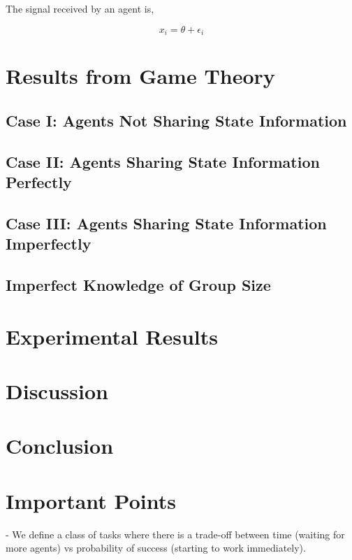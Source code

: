 \documentclass[conference]{IEEETran}
\begin{document}
The signal received by an agent is,

\begin{equation}
	x_i = \theta + \epsilon_i
\end{equation}


\section{Results from Game Theory}
\subsection{Case I: Agents Not Sharing State Information}

\subsection{Case II: Agents Sharing State Information Perfectly}

\subsection{Case III: Agents Sharing State Information Imperfectly}

\subsection{Imperfect Knowledge of Group Size}




\section{Experimental Results}




\section{Discussion}




\section{Conclusion}



\section{Important Points}
- We define a class of tasks where there is a trade-off between time (waiting for more agents) vs probability of success (starting to work immediately).
\end{document}
